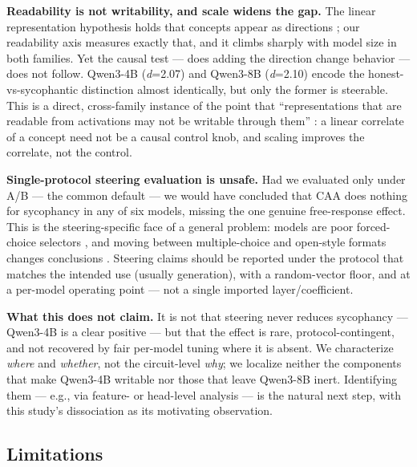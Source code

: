 \documentclass[11pt]{article}
\begin{document}
\textbf{Readability is not writability, and scale widens the gap.} The linear representation hypothesis
holds that concepts appear as directions \citep{park2023linear}; our readability axis measures exactly
that, and it climbs sharply with model size in both families. Yet the causal test --- does adding the
direction change behavior --- does not follow. Qwen3-4B (\emph{d}=2.07) and Qwen3-8B (\emph{d}=2.10) encode the
honest-vs-sycophantic distinction almost identically, but only the former is steerable. This is a
direct, cross-family instance of the point that ``representations that are readable from activations
may not be writable through them'' \citep{buchan2026dualstance}: a linear correlate of a concept need
not be a causal control knob, and scaling improves the correlate, not the control.

\textbf{Single-protocol steering evaluation is unsafe.} Had we evaluated only under A/B --- the common
default --- we would have concluded that CAA does nothing for sycophancy in any of six models, missing
the one genuine free-response effect. This is the steering-specific face of a general problem: models
are poor forced-choice selectors \citep{zheng2023mcqselectors}, and moving between multiple-choice and
open-style formats changes conclusions \citep{myrzakhan2024openllm, wang2025rightanswer}. Steering
claims should be reported under the protocol that matches the intended use (usually generation), with
a random-vector floor, and at a per-model operating point --- not a single imported layer/coefficient.

\textbf{What this does not claim.} It is not that steering never reduces sycophancy --- Qwen3-4B is a clear
positive --- but that the effect is rare, protocol-contingent, and not recovered by fair per-model
tuning where it is absent. We characterize \emph{where} and \emph{whether}, not the circuit-level \emph{why}; we
localize neither the components that make Qwen3-4B writable nor those that leave Qwen3-8B inert.
Identifying them --- e.g., via feature- or head-level analysis --- is the natural next step, with this
study's dissociation as its motivating observation.

\subsection{Limitations}\label{limitations}
\end{document}
